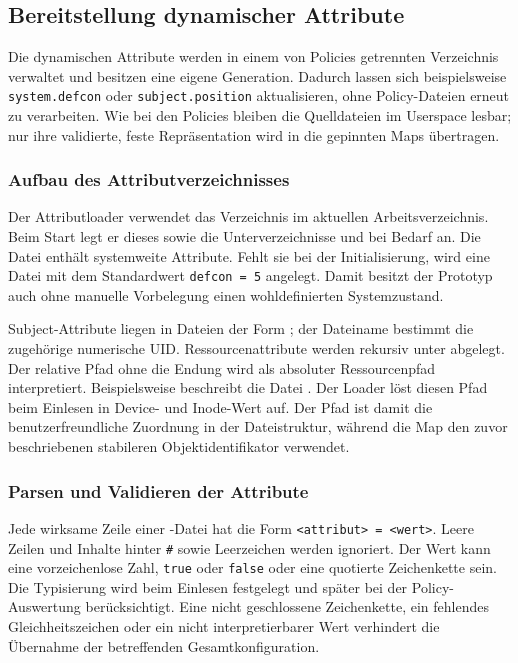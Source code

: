 \subsection{Bereitstellung dynamischer Attribute}\label{sec:attribute-loading}
Die dynamischen Attribute werden in einem von Policies getrennten Verzeichnis verwaltet und besitzen eine eigene Generation. Dadurch lassen sich beispielsweise \texttt{system.defcon} oder \texttt{subject.position} aktualisieren, ohne Policy-Dateien erneut zu verarbeiten. Wie bei den Policies bleiben die Quelldateien im Userspace lesbar; nur ihre validierte, feste Repräsentation wird in die gepinnten Maps übertragen.

\subsubsection{Aufbau des Attributverzeichnisses}
Der Attributloader verwendet das Verzeichnis  im aktuellen Arbeitsverzeichnis. Beim Start legt er dieses sowie die Unterverzeichnisse  und  bei Bedarf an. Die Datei  enthält systemweite Attribute. Fehlt sie bei der Initialisierung, wird eine Datei mit dem Standardwert \texttt{defcon = 5} angelegt. Damit besitzt der Prototyp auch ohne manuelle Vorbelegung einen wohldefinierten Systemzustand.

Subject-Attribute liegen in Dateien der Form ; der Dateiname bestimmt die zugehörige numerische UID. Ressourcenattribute werden rekursiv unter  abgelegt. Der relative Pfad ohne die Endung  wird als absoluter Ressourcenpfad interpretiert. Beispielsweise beschreibt  die Datei . Der Loader löst diesen Pfad beim Einlesen in Device- und Inode-Wert auf. Der Pfad ist damit die benutzerfreundliche Zuordnung in der Dateistruktur, während die Map den zuvor beschriebenen stabileren Objektidentifikator verwendet.

\subsubsection{Parsen und Validieren der Attribute}
Jede wirksame Zeile einer -Datei hat die Form \texttt{<attribut> = <wert>}. Leere Zeilen und Inhalte hinter \texttt{\#} sowie Leerzeichen werden ignoriert. Der Wert kann eine vorzeichenlose Zahl, \texttt{true} oder \texttt{false} oder eine quotierte Zeichenkette sein. Die Typisierung wird beim Einlesen festgelegt und später bei der Policy-Auswertung berücksichtigt. Eine nicht geschlossene Zeichenkette, ein fehlendes Gleichheitszeichen oder ein nicht interpretierbarer Wert verhindert die Übernahme der betreffenden Gesamtkonfiguration.

